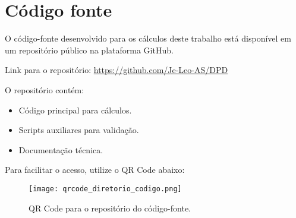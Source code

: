 \chapter{Código fonte}
O código-fonte desenvolvido para os cálculos deste trabalho está disponível em um repositório público na plataforma GitHub.  

Link para o repositório:  
\url{https://github.com/Je-Leo-AS/DPD}  

O repositório contém:
\begin{itemize}
	\item Código principal para cálculos.
	\item Scripts auxiliares para validação.
	\item Documentação técnica. 
\end{itemize}     

Para facilitar o acesso, utilize o QR Code abaixo:  

\begin{figure}[H]
	\centering
	\texttt{[image: qrcode\_diretorio\_codigo.png]}
	\caption{QR Code para o repositório do código-fonte.}
\end{figure}

